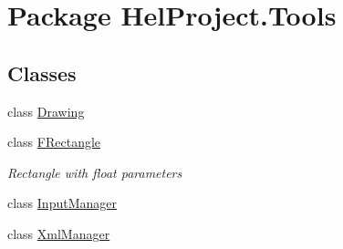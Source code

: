 \hypertarget{namespace_hel_project_1_1_tools}{}\section{Package Hel\+Project.\+Tools}
\label{namespace_hel_project_1_1_tools}
\subsection*{Classes}
\begin{DoxyCompactItemize}
\item 
class \hyperlink{class_hel_project_1_1_tools_1_1_drawing}{Drawing}
\item 
class \hyperlink{class_hel_project_1_1_tools_1_1_f_rectangle}{F\+Rectangle}
\begin{DoxyCompactList}\small\item\em Rectangle with float parameters \end{DoxyCompactList}\item 
class \hyperlink{class_hel_project_1_1_tools_1_1_input_manager}{Input\+Manager}
\item 
class \hyperlink{class_hel_project_1_1_tools_1_1_xml_manager}{Xml\+Manager}
\end{DoxyCompactItemize}

